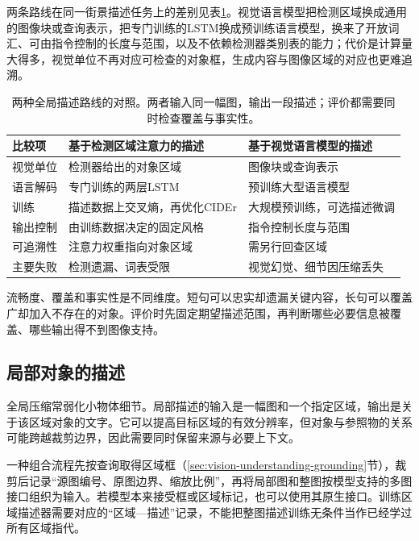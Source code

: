 两条路线在同一街景描述任务上的差别见表\ref{tab:vision-understanding-caption-compare}。视觉语言模型把检测区域换成通用的图像块或查询表示，把专门训练的LSTM换成预训练语言模型，换来了开放词汇、可由指令控制的长度与范围，以及不依赖检测器类别表的能力；代价是计算量大得多，视觉单位不再对应可检查的对象框，生成内容与图像区域的对应也更难追溯。

\begin{table}[htbp]
  \centering
  \small
  \begin{tabularx}{\linewidth}{@{}p{14mm}XX@{}}
    \toprule
    比较项 & 基于检测区域注意力的描述 & 基于视觉语言模型的描述\\
    \midrule
    视觉单位 & 检测器给出的对象区域 & 图像块或查询表示\\
    语言解码 & 专门训练的两层LSTM & 预训练大型语言模型\\
    训练 & 描述数据上交叉熵，再优化CIDEr & 大规模预训练，可选描述微调\\
    输出控制 & 由训练数据决定的固定风格 & 指令控制长度与范围\\
    可追溯性 & 注意力权重指向对象区域 & 需另行回查区域\\
    主要失败 & 检测遗漏、词表受限 & 视觉幻觉、细节因压缩丢失\\
    \bottomrule
  \end{tabularx}
  \caption{两种全局描述路线的对照。两者输入同一幅图，输出一段描述；评价都需要同时检查覆盖与事实性。}
  \label{tab:vision-understanding-caption-compare}
\end{table}

流畅度、覆盖和事实性是不同维度。短句可以忠实却遗漏关键内容，长句可以覆盖广却加入不存在的对象。评价时先固定期望描述范围，再判断哪些必要信息被覆盖、哪些输出得不到图像支持。

\subsection{局部对象的描述}
\label{sec:vision-understanding-region-caption}
\label{sec:vision-understanding-crop-caption}

全局压缩常弱化小物体细节。局部描述的输入是一幅图和一个指定区域，输出是关于该区域对象的文字。它可以提高目标区域的有效分辨率，但对象与参照物的关系可能跨越裁剪边界，因此需要同时保留来源与必要上下文。

一种组合流程先按查询取得区域框（\ref{sec:vision-understanding-grounding}节），裁剪后记录“源图编号、原图边界、缩放比例”，再将局部图和整图按模型支持的多图接口组织为输入。若模型本来接受框或区域标记，也可以使用其原生接口。训练区域描述器需要对应的“区域—描述”记录，不能把整图描述训练无条件当作已经学过所有区域指代。

